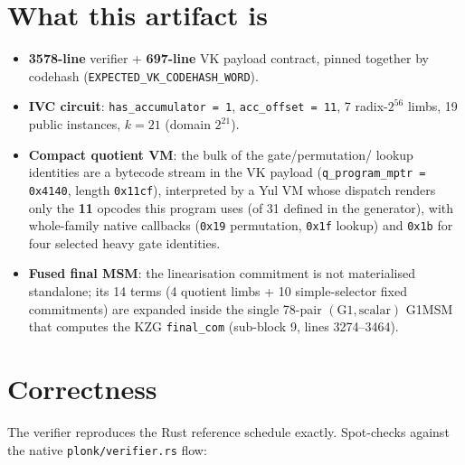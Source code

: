 \section{What this artifact is}
\label{sec:pr-what}

\begin{itemize}[leftmargin=1.4em,itemsep=1pt]
  \item \textbf{3578-line} verifier + \textbf{697-line} VK payload
        contract, pinned together by codehash
        (\texttt{EXPECTED\_\allowbreak{}VK\_\allowbreak{}CODEHASH\_\allowbreak{}WORD}).
  \item \textbf{IVC circuit}: \texttt{has\_\allowbreak{}accumulator = 1},
        \texttt{acc\_offset = 11}, 7 radix-$2^{56}$ limbs, 19 public
        instances, $k=21$ (domain $2^{21}$).
  \item \textbf{Compact quotient VM}: the bulk of the gate/permutation/
        lookup identities are a bytecode stream in the VK payload
        (\texttt{q\_\allowbreak{}program\_\allowbreak{}mptr = 0x4140}, length \texttt{0x11cf}),
        interpreted by a Yul VM whose dispatch renders only the
        \textbf{11} opcodes this program uses (of 31 defined in the
        generator), with whole-family native callbacks
        (\texttt{0x19} permutation, \texttt{0x1f} lookup) and
        \texttt{0x1b} for four selected heavy gate identities.
  \item \textbf{Fused final MSM}: the linearisation commitment is not
        materialised standalone; its 14 terms (4 quotient limbs + 10
        simple-selector fixed commitments) are expanded inside the single
        78-pair $(\text{G1},\text{scalar})$ G1MSM that computes the KZG
        \texttt{final\_com} (sub-block 9, lines 3274--3464).
\end{itemize}

\section{Correctness}
\label{sec:pr-correct}

The verifier reproduces the Rust reference schedule exactly. Spot-checks
against the native \texttt{plonk/verifier.rs} flow:

